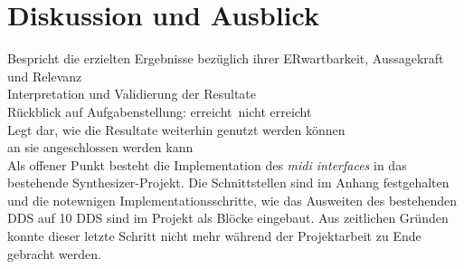 
\chapter{Diskussion und Ausblick}\label{chap.diskussion}

Bespricht die erzielten Ergebnisse bezüglich ihrer ERwartbarkeit, Aussagekraft und Relevanz\\
Interpretation und Validierung der Resultate\\
Rückblick auf Aufgabenstellung: erreicht\ nicht erreicht\\

Legt dar, wie die Resultate weiterhin genutzt werden können\\ an sie angeschlossen werden kann\\




Als offener Punkt besteht die Implementation des \textit{midi interfaces} in das bestehende Synthesizer-Projekt. Die Schnittstellen sind im Anhang festgehalten und die notewnigen Implementationsschritte, wie das Ausweiten des bestehenden DDS auf 10 DDS sind im Projekt als Blöcke eingebaut. Aus zeitlichen Gründen konnte dieser letzte Schritt nicht mehr während der Projektarbeit zu Ende gebracht werden. 